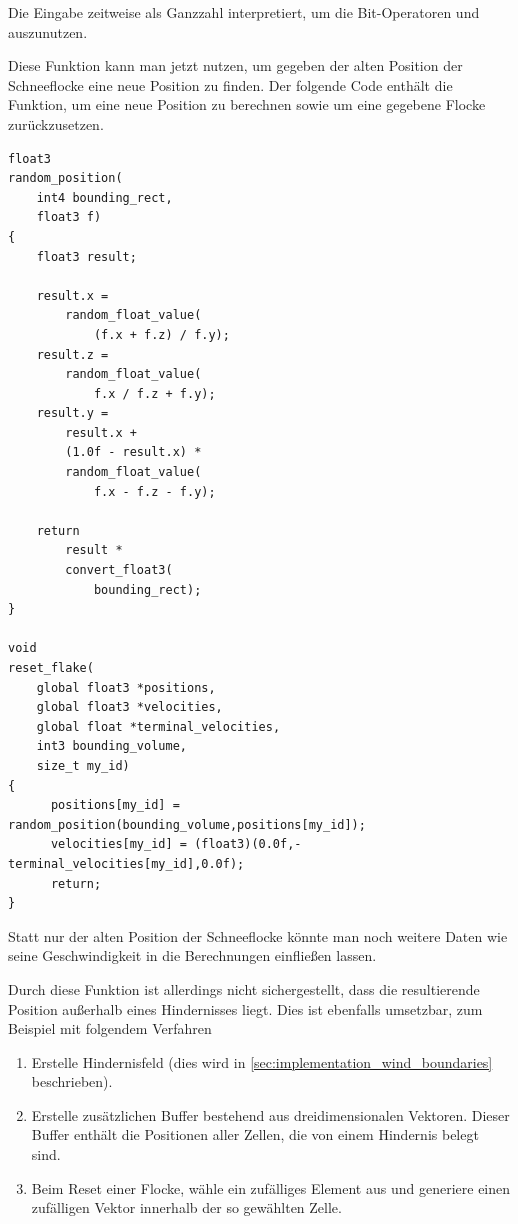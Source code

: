 Die Eingabe  zeitweise als Ganzzahl interpretiert, um
die Bit-Operatoren \PimiddyInlineCode{\&} und \PimiddyInlineCode{|}
auszunutzen.

Diese Funktion kann man jetzt nutzen, um gegeben der alten Position
der Schneeflocke eine neue Position zu finden. Der folgende Code
enthält die Funktion, um eine neue Position zu berechnen sowie um eine
gegebene Flocke zurückzusetzen.

\begin{verbatim}
float3
random_position(
    int4 bounding_rect,
    float3 f)
{
    float3 result;

    result.x =
        random_float_value(
            (f.x + f.z) / f.y);
    result.z =
        random_float_value(
            f.x / f.z + f.y);
    result.y =
        result.x +
        (1.0f - result.x) *
        random_float_value(
            f.x - f.z - f.y);

    return
        result *
        convert_float3(
            bounding_rect);
}

void
reset_flake(
    global float3 *positions,
    global float3 *velocities,
    global float *terminal_velocities,
    int3 bounding_volume,
    size_t my_id)
{
      positions[my_id] = random_position(bounding_volume,positions[my_id]);
      velocities[my_id] = (float3)(0.0f,-terminal_velocities[my_id],0.0f);
      return;
}
\end{verbatim}

Statt nur der alten Position der Schneeflocke könnte man noch weitere
Daten wie seine Geschwindigkeit in die Berechnungen einfließen lassen.

Durch diese Funktion ist allerdings nicht sichergestellt, dass die
resultierende Position außerhalb eines Hindernisses liegt. Dies ist
ebenfalls umsetzbar, zum Beispiel mit folgendem Verfahren

\begin{enumerate}
\item Erstelle Hindernisfeld (dies wird in
\ref{sec:implementation_wind_boundaries} beschrieben).
\item Erstelle zusätzlichen Buffer
 bestehend aus dreidimensionalen
Vektoren. Dieser Buffer enthält die Positionen aller Zellen, die von
einem Hindernis belegt sind.
\item Beim Reset einer Flocke, wähle ein zufälliges Element aus
 und generiere einen zufälligen
Vektor innerhalb der so gewählten Zelle.
\end{enumerate}

